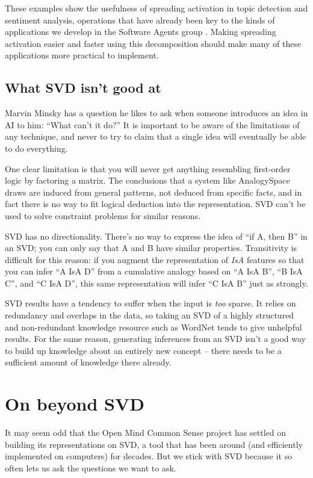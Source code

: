 \documentclass[11pt]{article}
\begin{document}
These examples show the usefulness of spreading activation in topic detection
and sentiment analysis, operations that have already been key to the kinds of
applications we develop in the Software Agents group \cite{aria} \cite{wear}
\cite{wreck}. Making spreading activation easier and faster using this
decomposition should make many of these applications more practical to
implement.

\subsection{What SVD isn't good at}

Marvin Minsky has a question he likes to ask when someone introduces an idea in
AI to him: ``What can't it do?'' It is important to be aware of the limitations
of any technique, and never to try to claim that a single idea will eventually
be able to do everything.

One clear limitation is that you will never get anything resembling first-order
logic by factoring a matrix. The conclusions that a system like AnalogySpace
draws are induced from general patterns, not deduced from specific facts, and
in fact there is no way to fit logical deduction into the representation. 
SVD can't be used to solve constraint problems for similar reasons.

SVD has no directionality. There's no way to express the idea of ``if A, then
B'' in an SVD; you can only say that A and B have similar properties.
Transitivity is difficult for this reason: if you augment the representation of {\em IsA} features so that you can infer ``A IsA D'' from a
cumulative analogy based on ``A IsA B'', ``B IsA C'', and ``C IsA D'', this same representation will infer ``C IsA B'' just as strongly.

SVD results have a tendency to suffer when the input is {\em too} sparse. It
relies on redundancy and overlaps in the data, so taking an SVD of a highly
structured and non-redundant knowledge resource such as WordNet tends to give
unhelpful results. For the same reason, generating inferences from an SVD isn't
a good way to build up knowledge about an entirely new concept -- there needs
to be a sufficient amount of knowledge there already.

\section{On beyond SVD}

It may seem odd that the Open Mind Common Sense project has settled on building
its representations on SVD, a tool that has been around (and efficiently
implemented on computers) for decades. But we stick with SVD because it so
often lets us ask the questions we want to ask.
\end{document}
